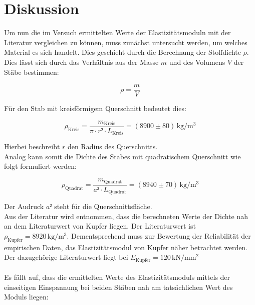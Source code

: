 %

%
\section{Diskussion}
\label{sec:Diskussion}

Um nun die im Versuch ermittelten Werte der Elastizitätsmoduln mit der Literatur vergleichen zu können, muss
zunächst untersucht werden, um welches Material es sich handelt. Dies geschieht durch die Berechnung der Stoffdichte $\rho$.
Dies lässt sich durch das Verhältnis aus der Masse $m$ und des Volumens $V$ der Stäbe bestimmen:

\begin{equation*}
    \rho = \frac{m}{V}
\end{equation*}

\noindent Für den Stab mit kreisförmigem Querschnitt bedeutet dies:

\begin{equation}
    \rho_\text{Kreis} = \frac{m_\text{Kreis}}{\pi\cdot r²\cdot L_\text{Kreis}} = (8900 \pm 80)\,\unit{\kilo\gram\per\cubic\meter}
\end{equation}

\noindent Hierbei beschreibt $r$ den Radius des Querschnitts.\\
Analog kann somit die Dichte des Stabes mit quadratischem Querschnitt wie folgt formuliert werden:

\begin{equation}
    \rho_\text{Quadrat} = \frac{m_\text{Quadrat}}{a²\cdot L_\text{Quadrat}} = (8940 \pm 70)\,\unit{\kilo\gram\per\cubic\meter}
\end{equation}

\noindent Der Audruck $a²$ steht für die Querschnittsfläche.\\
Aus der Literatur \cite{Dichte_Kupfer} wird entnommen, dass die berechneten Werte der Dichte nah an dem Literaturwert von Kupfer liegen.
Der Literaturwert ist $\rho_\text{Kupfer} = 8920\,\unit{\kilo\gram\per\cubic\meter}$. Dementsprechend muss zur Bewertung der Reliabilität der
empirischen Daten, das Elastizitätsmodul von Kupfer näher betrachtet werden. Der dazugehörige Literaturwert \cite{Modul_Kupfer} liegt bei
$E_\text{Kupfer} = 120\,\unit{\kilo\newton\per\milli\meter\squared}$\\\\

\noindent Es fällt auf, dass die ermittelten Werte des Elastizitätsmoduls mittels der einseitigen Einspannung bei beiden Stäben nah am 
tatsächlichen Wert des Moduls liegen:

